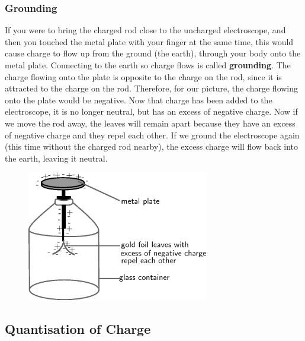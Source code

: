             \subsubsection{ Grounding}
            \nopagebreak
          \label{m38781*id200585}If you were to bring the charged rod close to the uncharged electroscope, and then you touched the metal plate with your finger at the same time, this would cause charge to flow up from the ground (the earth), through your body onto the metal plate. Connecting to the earth so charge flows is called \textbf{grounding}. The charge flowing onto the plate is opposite to the charge on the rod, since it is attracted to the charge on the rod. Therefore, for our picture, the charge flowing onto the plate would be negative. Now that charge has been added to the electroscope, it is no longer neutral, but has an excess of negative charge. Now if we move the rod away, the leaves will remain apart because they have an excess of negative charge and they repel each other. If we ground the electroscope again (this time without the charged rod nearby), the excess charge will flow back into the earth, leaving it neutral.\par 
          \label{m38781*id200601}
    \setcounter{subfigure}{0}
	\begin{figure}[H] %
    \begin{center}
    \label{m38781*id200605!!!underscore!!!media}\label{m38781*id200605!!!underscore!!!printimage}\includegraphics[width=300px]{col11305.imgs/m38781_PG10C8_010.png} %
      \vspace{2pt}
    \vspace{.1in}
    \end{center}
 \end{figure}       
          \par 
\label{m38781*fs-id1165908850940}
            \subsection{ Quantisation of Charge}
            \nopagebreak
            \label{m38781*eip-97}

